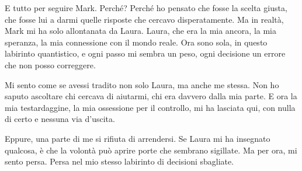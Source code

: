 E tutto per seguire Mark. Perché? Perché ho pensato che fosse la scelta giusta, che fosse lui a darmi quelle risposte che cercavo disperatamente. Ma in realtà, Mark mi ha solo allontanata da Laura. Laura, che era la mia ancora, la mia speranza, la mia connessione con il mondo reale. Ora sono sola, in questo labirinto quantistico, e ogni passo mi sembra un peso, ogni decisione un errore che non posso correggere.

Mi sento come se avessi tradito non solo Laura, ma anche me stessa. Non ho saputo ascoltare chi cercava di aiutarmi, chi era davvero dalla mia parte. E ora la mia testardaggine, la mia ossessione per il controllo, mi ha lasciata qui, con nulla di certo e nessuna via d'uscita.

Eppure, una parte di me si rifiuta di arrendersi. Se Laura mi ha insegnato qualcosa, è che la volontà può aprire porte che sembrano sigillate. Ma per ora, mi sento persa. Persa nel mio stesso labirinto di decisioni sbagliate.


